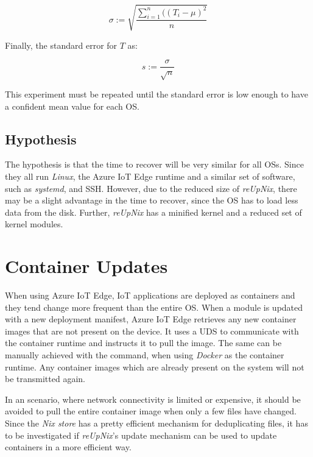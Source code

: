 \begin{equation}
   \sigma := \sqrt{\frac{\sum_{i=1}^{n}((T_i - \mu)^2}{n}}
\end{equation}

\noindent
Finally, the standard error for $T$ as:

\begin{equation}
    s := \frac{\sigma}{\sqrt{n}}
\end{equation}

\noindent
This experiment must be repeated until the standard error is low enough
to have a confident mean value for each \ac{OS}.

\subsection{Hypothesis}
The hypothesis is that the time to recover will be very similar for all
\ac{OS}s. Since they all run \textit{Linux}, the Azure IoT Edge runtime and
a similar set of software, such as \textit{systemd}, and \ac{SSH}. However, due
to the reduced size of \textit{reUpNix}, there may be a slight advantage in the
time to recover, since the \ac{OS} has to load less data from the disk. Further,
\textit{reUpNix} has a minified kernel and a reduced set of kernel modules.

\section{Container Updates}
\label{sec:container-updates}
When using Azure IoT Edge, \ac{IoT} applications are deployed as containers and
they tend change more frequent than the entire \ac{OS}. When a module is updated
with a new deployment manifest, Azure IoT Edge retrieves any new container
images that are not present on the device. It uses a \ac{UDS} to communicate
with the container runtime and instructs it to pull the image. The same can be
manually achieved with the  command, when using \textit{Docker}
as the container runtime. Any container images which are already present on the
system will not be transmitted again.

In an scenario, where network connectivity is limited or expensive,
it should be avoided to pull the entire container image when only a few files have
changed. Since the \textit{Nix store} has a pretty efficient mechanism for
deduplicating files, it has to be investigated if \textit{reUpNix}'s
update mechanism can be used to update containers in a more efficient way.


